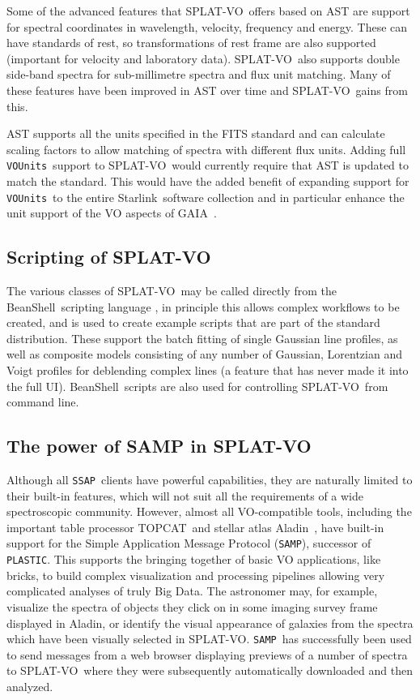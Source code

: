 \documentclass[final,authoryear,5p,times,twocolumn]{elsarticle}
\newcommand{\ssap}{\texttt{SSAP}}
\newcommand{\plastic}{\texttt{PLASTIC}}
\newcommand{\samp}{\texttt{SAMP}}
\newcommand{\vounits}{\texttt{VOUnits}}
\newcommand{\splatvo}{{\textsf{\small{SPLAT-VO}}}}
\newcommand{\topcat}{\textsf{\small TOPCAT}}
\newcommand{\aladin}{\textsf{\small Aladin}}
\newcommand{\gaia}{\textsf{\small GAIA}}
\newcommand{\Starlink}{\textsf{\small Starlink}}
\newcommand{\beanshell}{\textsf{\small BeanShell}}
\newcommand{\ascl}[1]{\href{http://www.ascl.net/#1}{ascl:#1}}
\begin{document}
Some of the advanced features that \splatvo\ offers based on AST are support
for spectral coordinates in wavelength, velocity, frequency and energy. These
can have standards of rest, so transformations of rest frame are also supported
(important for velocity and laboratory data). \splatvo\ also supports double
side-band spectra for sub-millimetre spectra and flux unit matching. Many of
these features have been improved in AST over time and \splatvo\ gains from
this.

AST supports all the units specified in the FITS standard
\citep{2010A&A...524A..42P} and can calculate scaling factors to allow matching
of spectra with different flux units. Adding full \vounits\ support
\citep{vounits} to \splatvo\ would currently require that AST is updated to
match the standard. This would have the added benefit of expanding support for
\vounits\ to the entire \Starlink\ software collection and in particular
enhance the unit support of the VO aspects of \gaia\
\citep{2009ASPC..411..575D}.

\subsection{Scripting of SPLAT-VO}
%
The various classes of \splatvo\ may be called directly from the \beanshell\
scripting language \citep{niemeyer2013learning}, in principle this allows
complex workflows to be created, and is used to create example scripts that are
part of the standard distribution. These support the batch fitting of single
Gaussian line profiles, as well as composite models consisting of any number of
Gaussian, Lorentzian and Voigt profiles for deblending complex lines (a feature
that has never made it into the full UI). \beanshell\  scripts are also used
for controlling \splatvo\ from command line.

\subsection{The power of SAMP in SPLAT-VO}
%
Although all \ssap\ clients have powerful capabilities, they are naturally
limited to their built-in features, which will not suit all the requirements of
a wide spectroscopic community. However, almost all VO-compatible tools,
including the important table processor \topcat\ and stellar atlas \aladin\
\citep[][\ascl{1112.019}]{2005ASPC..347..193O}, have built-in support for the
Simple Application Message Protocol (\samp), successor of \plastic. This
supports the bringing together of basic VO applications, like bricks, to build
complex visualization and processing pipelines allowing very complicated
analyses of truly Big Data.  The astronomer may, for example, visualize the
spectra of objects they click on in some imaging survey frame displayed in
\aladin, or identify the visual appearance of galaxies from the spectra which
have been visually selected in \splatvo. \samp\ has successfully been used to
send messages from a web browser displaying previews of a number of spectra to
\splatvo\ where they were subsequently automatically downloaded and then
analyzed.
\end{document}
